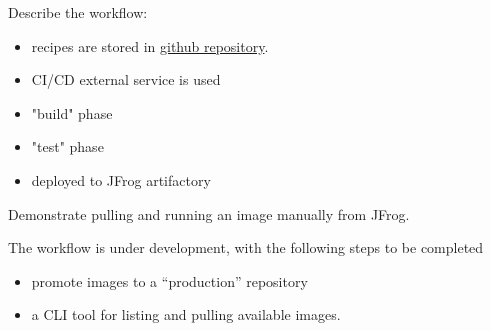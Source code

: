 Describe the workflow:
\begin{itemize}
    \item recipes are stored in \href{https://github.com/eth-cscs/alps-spack-stacks}{github repository}.
    \item CI/CD external service is used
    \item "build" phase
    \item "test" phase
    \item deployed to JFrog artifactory
\end{itemize}

Demonstrate pulling and running an image manually from JFrog.

The workflow is under development, with the following steps to be completed
\begin{itemize}
    \item promote images to a ``production'' repository
    \item a CLI tool for listing and pulling available images.
\end{itemize}

